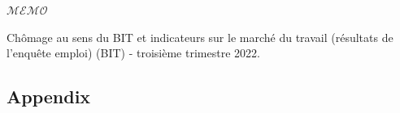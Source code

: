 \documentclass[12pt]{article}  %
\begin{document}
\begin{letter}{\huge{$\mathscr{MEMO}$}}
\end{letter}



















\newpage
\begin{thebibliography}{100}

Chômage au sens du {BIT} et indicateurs sur le marché du travail (résultats
  de l’enquête emploi) ({BIT}) - troisième trimestre 2022.
\end{thebibliography}



\begin{subappendices}  %
\section{Appendix}


\end{subappendices}  %
\end{document}
